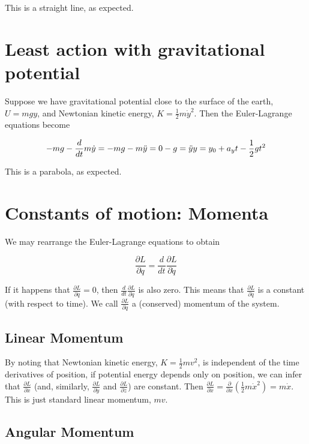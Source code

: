 \documentclass{article}
\begin{document}
This is a straight line, as expected.

\section*{Least action with gravitational potential}

Suppose we have gravitational potential close to the surface of the earth, \(U=m g y\), and Newtonian kinetic energy, \(K=\frac{1}{2}m \dot{y}^2\).
{ }Then the Euler-Lagrange equations become

\[-m g-\frac{d}{dt}m \dot{y}=-m g-m \ddot{y}=0\\
\\
-g=\ddot{y}\\
\\
y=y_0+a_yt-\frac{1}{2}g t^2\]

This is a parabola, as expected.

\section*{Constants of motion: Momenta}

We may rearrange the Euler-Lagrange equations to obtain

\[\frac{\partial L}{\partial q}=\frac{d}{dt}\frac{\partial L}{\partial \dot{q}}\]

If it happens that \(\frac{\partial L}{\partial q}=0\), then \(\frac{d}{dt}\frac{\partial L}{\partial \dot{q}}\) is also zero. { }This means that
\(\frac{\partial L}{\partial \dot{q}}\) is a constant (with respect to time). { }We call \(\frac{\partial L}{\partial \dot{q}}\) a (conserved) momentum
of the system.

\subsection*{Linear Momentum}

By noting that Newtonian kinetic energy, \(K =\frac{1}{2}m v^2\), is independent of the time derivatives of position, if potential energy depends
only on position, we can infer that \(\frac{\partial L}{\partial \dot{x}}\) (and, similarly, \(\frac{\partial L}{\partial \dot{y}}\) and \(\frac{\partial
L}{\partial \dot{z}}\)) are constant. { }Then \(\frac{\partial L}{\partial \dot{x}}=\frac{\partial }{\partial \dot{x}}\left(\frac{1}{2}m \dot{x}^2\right)=m
\dot{x}\). { }This is just standard linear momentum, \(m v\).

\subsection*{Angular Momentum}
\end{document}
